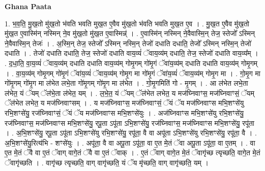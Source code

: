 \documentclass[17pt]{extarticle}
\begin{document}
\textbf{Ghana Paata } \newline

1. भ॒व॒ति॒ मु॒ख॒तो मु॑ख॒तो भ॑वति भवति मुख॒त ए॒वैव मु॑ख॒तो भ॑वति भवति मुख॒त ए॒व । . मु॒ख॒त ए॒वैव मु॑ख॒तो मु॑ख॒त ए॒वास्मि॑न् नस्मिन् ने॒व मु॑ख॒तो मु॑ख॒त ए॒वास्मिन्न्॑ । . ए॒वास्मि॑न् नस्मिन् ने॒वैवास्मि॒न् तेज॒ स्तेजो᳚ ऽस्मिन् ने॒वैवास्मि॒न् तेजः॑ । . अ॒स्मि॒न् तेज॒ स्तेजो᳚ ऽस्मिन् नस्मि॒न् तेजो॑ दधाति दधाति॒ तेजो᳚ ऽस्मिन् नस्मि॒न् तेजो॑ दधाति । . तेजो॑ दधाति दधाति॒ तेज॒ स्तेजो॑ दधाति वाय॒व्यं॑ ॅवाय॒व्य॑म् दधाति॒ तेज॒ स्तेजो॑ दधाति वाय॒व्य᳚म् । . द॒धा॒ति॒ वा॒य॒व्यं॑ ॅवाय॒व्य॑म् दधाति दधाति वाय॒व्य॑म् गोमृ॒गम् गो॑मृ॒गं ॅवा॑य॒व्य॑म् दधाति दधाति वाय॒व्य॑म् गोमृ॒गम् । . वा॒य॒व्य॑म् गोमृ॒गम् गो॑मृ॒गं ॅवा॑य॒व्यं॑ ॅवाय॒व्य॑म् गोमृ॒ग मा गो॑मृ॒गं ॅवा॑य॒व्यं॑ ॅवाय॒व्य॑म् गोमृ॒ग मा । . गो॒मृ॒ग मा गो॑मृ॒गम् गो॑मृ॒ग मा ल॑भेत लभे॒ता गो॑मृ॒गम् गो॑मृ॒ग मा ल॑भेत । . गो॒मृ॒गमिति॑ गो - मृ॒गम् । . आ ल॑भेत लभे॒ता ल॑भेत॒ यं ॅयम् ॅल॑भे॒ता ल॑भेत॒ यम् । . ल॒भे॒त॒ यं ॅयम् ॅल॑भेत लभेत॒ य मज॑घ्निवाꣳस॒ मज॑घ्निवाꣳसं॒ ॅयम् ॅल॑भेत लभेत॒ य मज॑घ्निवाꣳसम् । . य मज॑घ्निवाꣳस॒ मज॑घ्निवाꣳसं॒ ॅयं ॅय मज॑घ्निवाꣳस मभि॒शꣳसे॑यु रभि॒शꣳसे॑यु॒ रज॑घ्निवाꣳसं॒ ॅयं ॅय मज॑घ्निवाꣳस मभि॒शꣳसे॑युः । . अज॑घ्निवाꣳस मभि॒शꣳसे॑यु रभि॒शꣳसे॑यु॒ रज॑घ्निवाꣳस॒ मज॑घ्निवाꣳस मभि॒शꣳसे॑यु॒ रपू॒ता ऽपू॑ता ऽभि॒शꣳसे॑यु॒ रज॑घ्निवाꣳस॒ मज॑घ्निवाꣳस मभि॒शꣳसे॑यु॒ रपू॑ता । . अ॒भि॒शꣳसे॑यु॒ रपू॒ता ऽपू॑ता ऽभि॒शꣳसे॑यु रभि॒शꣳसे॑यु॒ रपू॑ता॒ वै वा अपू॑ता ऽभि॒शꣳसे॑यु रभि॒शꣳसे॑यु॒ रपू॑ता॒ वै । . अ॒भि॒शꣳसे॑यु॒रित्य॑भि - शꣳसे॑युः । . अपू॑ता॒ वै वा अपू॒ता ऽपू॑ता॒ वा ए॒त मे॒तं ॅवा अपू॒ता ऽपू॑ता॒ वा ए॒तम् । . वा ए॒त मे॒तं ॅवै वा ए॒तं ॅवाग् वागे॒तं ॅवै वा ए॒तं ॅवाक् । . ए॒तं ॅवाग् वागे॒त मे॒तं ॅवागृ॑च्छ त्यृच्छति॒ वागे॒त मे॒तं ॅवागृ॑च्छति । . वागृ॑च्छ त्यृच्छति॒ वाग् वागृ॑च्छति॒ यं ॅय मृ॑च्छति॒ वाग् वागृ॑च्छति॒ यम् । \newline
\end{document}
